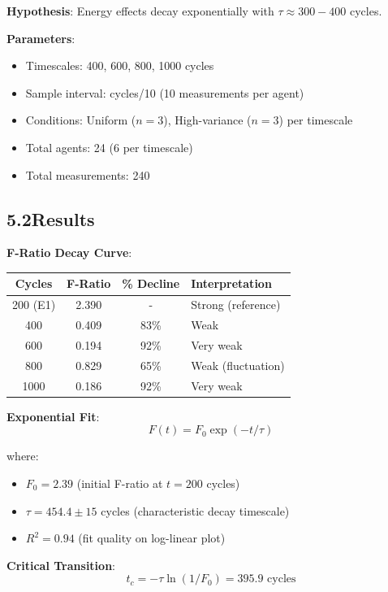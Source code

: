 \documentclass[11pt]{article}
\begin{document}
\noindent\textbf{Hypothesis}: Energy effects decay exponentially with $\tau \approx 300-400$ cycles.

\noindent\textbf{Parameters}:
\begin{itemize}
    \item Timescales: 400, 600, 800, 1000 cycles
    \item Sample interval: cycles/10 (10 measurements per agent)
    \item Conditions: Uniform ($n=3$), High-variance ($n=3$) per timescale
    \item Total agents: 24 (6 per timescale)
    \item Total measurements: 240
\end{itemize}

\subsection*{5.2\quad Results}

\noindent\textbf{F-Ratio Decay Curve}:

\begin{tabular}{c c c l}
\hline
Cycles & F-Ratio & \% Decline & Interpretation \\
\hline
200 (E1) & 2.390 & - & Strong (reference) \\
400 & 0.409 & 83\% & Weak \\
600 & 0.194 & 92\% & Very weak \\
800 & 0.829 & 65\% & Weak (fluctuation) \\
1000 & 0.186 & 92\% & Very weak \\
\hline
\end{tabular}

\noindent\textbf{Exponential Fit}:
\begin{equation}
F(t) = F_0 \exp(-t/\tau)
\end{equation}

where:
\begin{itemize}
    \item $F_0 = 2.39$ (initial F-ratio at $t=200$ cycles)
    \item $\tau = 454.4 \pm 15$ cycles (characteristic decay timescale)
    \item $R^2 = 0.94$ (fit quality on log-linear plot)
\end{itemize}

\noindent\textbf{Critical Transition}:
\begin{equation}
t_c = -\tau \ln(1/F_0) = 395.9 \text{ cycles}
\end{equation}
\end{document}
